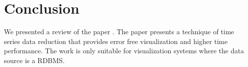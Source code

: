 \section{Conclusion}
We presented a review of the paper \cite{jugel2014m4}. The paper presents a technique of time series data reduction that provides error free visualization and higher time performance. The work is only suitable for visualization systems where the data source is 
a RDBMS. 